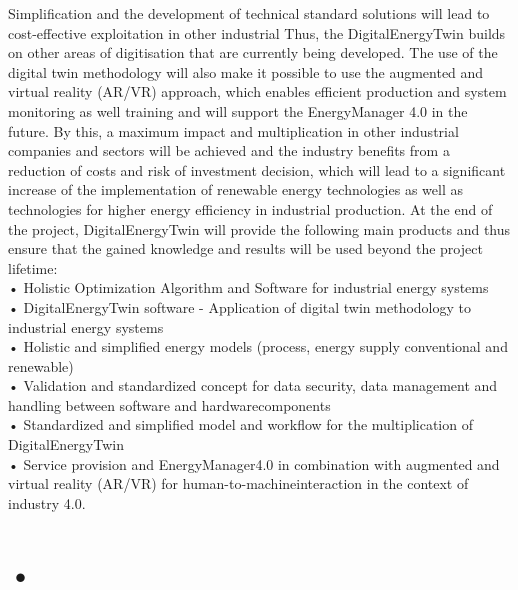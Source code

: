 Simplification and the development of technical standard solutions will lead to cost-effective exploitation in other industrial
Thus, the DigitalEnergyTwin builds on other areas of digitisation that are currently being developed. The use of the digital twin methodology will also make it possible to use the augmented and virtual reality (AR/VR) approach, which enables efficient production and system monitoring as well training and will support the EnergyManager 4.0 in the future. By this, a maximum impact and multiplication in other industrial companies and sectors will be achieved and the industry benefits from a reduction of costs and risk of investment decision, which will lead to a significant increase of the implementation of renewable energy technologies as well as technologies for higher energy efficiency in industrial production.
At the end of the project, DigitalEnergyTwin will provide the following main products and thus ensure that the gained knowledge and results will be used beyond the project lifetime: \\
• Holistic Optimization Algorithm and Software for industrial energy systems\\
• DigitalEnergyTwin software - Application of digital twin methodology to industrial energy systems \\
• Holistic and simplified energy models (process, energy supply conventional and renewable) \\
• Validation and standardized concept for data security, data management and handling between software and hardwarecomponents \\
• Standardized and simplified model and workflow for the multiplication of DigitalEnergyTwin \\
• Service provision and EnergyManager4.0 in combination with augmented and virtual reality (AR/VR) for human-to-machineinteraction in the context of industry 4.0.

\cite{FFGDET}

\section{•}

